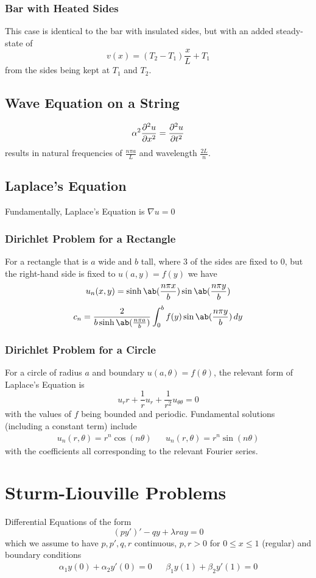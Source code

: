 \documentclass{article}
\begin{document}
\subsubsection{Bar with Heated Sides}
This case is identical to the bar with insulated sides, but with an added steady-state of
$$v(x)=(T_2-T_1)\frac{x}{L}+T_1$$ from the sides being kept at $T_1$ and $T_2$.

\subsection{Wave Equation on a String}
$$\alpha^2\pdv[order=2,2]{u}{x}=\pdv[order=2,2]{u}{t}$$ results in natural frequencies of $\frac{n\pi a}{L}$ and wavelength $\frac{2L}{n}$.

\subsection{Laplace's Equation}
Fundamentally, Laplace's Equation is
$\nabla u = 0$
\subsubsection{Dirichlet Problem for a Rectangle}
For a rectangle that is $a$ wide and $b$ tall, where 3 of the sides are fixed to $0$, but the right-hand side is fixed to $u(a,y)=f(y)$ we have
$$u_n(x,y)=\sinh\ab(\frac{n\pi x}{b})\sin\ab(\frac{n\pi y}{b})$$
$$c_n=\frac{2}{b\sinh\ab(\frac{n\pi a}{b})}\int_0^bf(y)\sin\ab(\frac{n \pi y}{b})\,dy$$

\subsubsection{Dirichlet Problem for a Circle}
For a circle of radius $a$ and boundary $u(a,\theta)=f(\theta)$, the relevant form of Laplace's Equation is
$$u_rr+\frac{1}{r}u_r+\frac{1}{r^2}u_{\theta\theta}=0$$
with the values of $f$ being bounded and periodic.
Fundamental solutions (including a constant term) include 
\begin{align*}
    u_n(r,\theta) = r^n\cos(n\theta) && u_n(r,\theta) = r^n\sin(n\theta)
\end{align*}
with the coefficients all corresponding to the relevant Fourier series.

\section{Sturm-Liouville Problems}
Differential Equations of the form
$$(py')' - qy + \lambda ray=0$$
which we assume to have $p,p',q,r$ continuous, $p,r>0$ for $0\le x\le1$ (regular) and boundary conditions
\begin{align*}
    \alpha_1y(0)+\alpha_2y'(0)=0&&\beta_1y(1)+\beta_2y'(1)=0
\end{align*}
\end{document}
